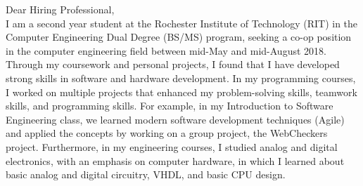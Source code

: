 \documentclass[line,margin]{res}
\begin{document}
\setlength\columnsep{-30pt}
\email{} %
\phone{} %
\address{} %
\address{} %
\website{} %

\begin{resume}
 \setlength
 \multicolsep{2pt}
 \begin{adjustwidth}{-92pt}{0pt}
 \vspace{10pt}

\noindent
Dear Hiring Professional, \\

\noindent
I am a second year student at the Rochester Institute of Technology (RIT) in the Computer Engineering Dual Degree (BS/MS) program, seeking a co-op position in the computer engineering field between mid-May and mid-August 2018. \\

\noindent
Through my coursework and personal projects, I found that I have developed strong skills in software and hardware development. In my programming courses, I worked on multiple projects that enhanced my problem-solving skills, teamwork skills, and programming skills. For example, in my Introduction to Software Engineering class, we learned modern software development techniques (Agile) and applied the concepts by working on a group project, the WebCheckers project. Furthermore, in my engineering courses, I studied analog and digital electronics, with an emphasis on computer hardware, in which I learned about basic analog and digital circuitry, VHDL, and basic CPU design. \\


\end{adjustwidth}
\end{resume}
\end{document}
